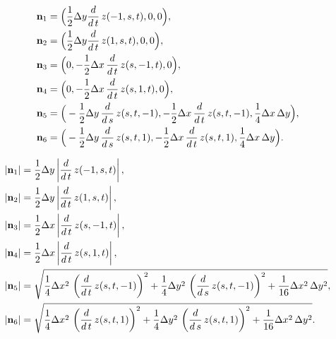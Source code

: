\documentclass[11pt]{article}
\begin{document}
\newcommand{\ddt}{\frac{d}{d\,t}}
\newcommand{\dds}{\frac{d}{d\,s}}
\begin{align*}
  \N_{1} &= \Big(\frac{1}{2}\dy\ddt\, z(-1, s, t), 0, 0  \Big), \\
  \N_{2} &= \Big(\frac{1}{2}\dy\ddt\, z(1, s, t), 0, 0  \Big), \\
  \N_{3} &= \Big(0, -\frac{1}{2}\dx\, \ddt\, z(s, -1, t), 0  \Big), \\
  \N_{4} &= \Big(0, -\frac{1}{2}\dx\, \ddt\, z(s, 1, t), 0  \Big), \\
  \N_{5} &= \Big(-\frac{1}{2}\dy\, \dds\, z(s, t, -1), -\frac{1}{2}\dx\, \ddt\, z(s, t, -1), \frac{1}{4}\dx\, \dy  \Big), \\
  \N_{6} &= \Big(-\frac{1}{2}\dy\, \dds\, z(s, t, 1), -\frac{1}{2}\dx\, \ddt\, z(s, t, 1), \frac{1}{4}\dx\, \dy  \Big) . \\
\end{align*}

\begin{align*}
  \left| \N_{1}\right|  & = \frac{1}{2}\dy\left| \ddt\,z(-1 , s , t)\right|, \\
  \left| \N_{2}\right|  & = \frac{1}{2}\dy\left| \ddt\,z(1 , s , t)\right|, \\
  \left| \N_{3}\right|  & = \frac{1}{2}\dx\left| \ddt\,z(s , -1 , t)\right|,\\
  \left| \N_{4}\right|  & = \frac{1}{2}\dx\left| \ddt\,z(s , 1 , t)\right|, \\
  \left| \N_{5}\right|  & = \sqrt{\frac{1}{4}\dx^2\,\left(\ddt\,z(s , t , -1)\right)^2+\frac{1}{4}\dy^2\,\left(\dds\,z(s , t , -1)\right)^2+\frac{1}{16}\dx^2\,\dy^2}, \\
  \left| \N_{6}\right|  & = \sqrt{\frac{1}{4}\dx^2\,\left(\ddt\,z(s , t , 1)\right)^2 +\frac{1}{4}\dy^2\,\left(\dds\,z(s , t , 1)\right)^2 +\frac{1}{16}\dx^2\,\dy^2}. \\
\end{align*}



\end{document}
